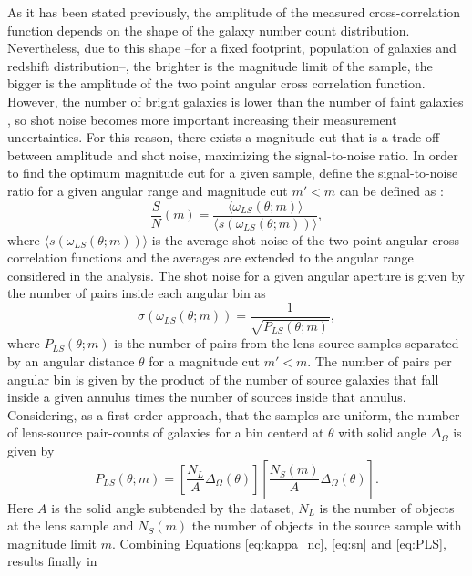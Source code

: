 As it has been stated previously, the amplitude of the measured cross-correlation function depends on the shape of the galaxy number count distribution. Nevertheless, due to this shape --for a fixed footprint, population of galaxies and redshift distribution--, the brighter is the magnitude limit of the sample, the bigger is the amplitude of the two point angular cross correlation function. However, the number of bright galaxies is lower than the number of faint galaxies \cite{1976ApJ...203..297S}, so shot noise becomes more important increasing their measurement uncertainties. For this reason, there exists a magnitude cut that is a trade-off between amplitude and shot noise, maximizing the signal-to-noise ratio.  In  order to find the optimum magnitude cut for a given sample, define the signal-to-noise ratio for a given angular range  and magnitude cut $m'<m$ can be defined as \cite{1998MNRAS.294L..18M}:
\begin{equation}
\frac{S}{N}(m) = \frac{\langle \omega_{LS}(\theta;m)\rangle}{\langle s(\omega_{LS}(\theta;m))\rangle},
\label{eq:sn}
\end{equation}
where $\langle s(\omega_{LS}(\theta;m))\rangle$ is the average shot noise of the two point angular cross correlation functions and the averages are extended to the angular range considered in the analysis. The shot noise for a given angular aperture is given by the number of pairs inside each angular bin as
\begin{equation}
\sigma(\omega_{LS}(\theta;m)) = \frac{1}{\sqrt{P_{LS}(\theta;m)}},
\end{equation}
where $P_{LS}(\theta;m)$ is the number of pairs from the lens-source samples separated by an angular distance $\theta$ for a magnitude cut $m '<m$. The number of pairs per angular bin is given by the product of the number of source galaxies that fall inside a given annulus times the number of sources inside that annulus. Considering, as a first order approach, that the samples are uniform, the number of lens-source pair-counts of galaxies for a bin centerd at $\theta$ with solid angle $\Delta_\Omega$ is given by
\begin{equation}
P_{LS}(\theta;m) = \left[\frac{N_L}{A}\Delta_\Omega(\theta)\right]\left[\frac{N_S(m)}{A}\Delta_\Omega(\theta)\right].
\label{eq:PLS}
\end{equation}
Here $A$ is the solid angle subtended by the dataset, $N_L$ is the number of objects at the lens sample and $N_S(m)$ the number of objects in the source sample with magnitude limit $m$. Combining Equations \ref{eq:kappa_nc}, \ref{eq:sn} and \ref{eq:PLS}, results finally in

